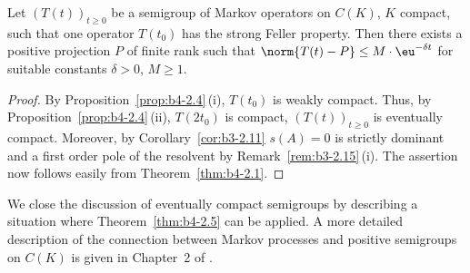 \begin{theorem}\label{thm:b4-2.5}
	Let $(T(t))_{t \geq 0}$ be a semigroup of Markov operators on
	$C(K)$, $K$ compact, such that one operator $T(t_{0})$ has the strong Feller
	property.
	Then there exists a positive projection $P$ of finite rank
	such that $\norm{T(t) - P} \leq M\cdot \eu^{-\delta t}$ for suitable constants $\delta>0$, $M \geq 1$.
\end{theorem}

\begin{proof}
	By Proposition~\ref{prop:b4-2.4}\,(i), $T(t_{0})$ is weakly compact.
	Thus, by Proposition~\ref{prop:b4-2.4}\,(ii),
	$T(2t_{0})$ is compact, \ie  $(T(t))_{t \geq 0}$ is eventually compact.
	Moreover,
	by Corollary~\ref{cor:b3-2.11} $s(A) = 0$ is strictly dominant and a first order
	pole of the resolvent by Remark~\ref{rem:b3-2.15}\,(i).
	The assertion now follows
	easily from Theorem~\ref{thm:b4-2.1}.
\end{proof}
We close the discussion of eventually compact semigroups by describing
a situation where Theorem~\ref{thm:b4-2.5} can be applied.
A more detailed description
of the connection between Markov processes and positive semigroups on
$C(K)$ is given in Chapter~2 of \textcite{vancasteren:1985}.

